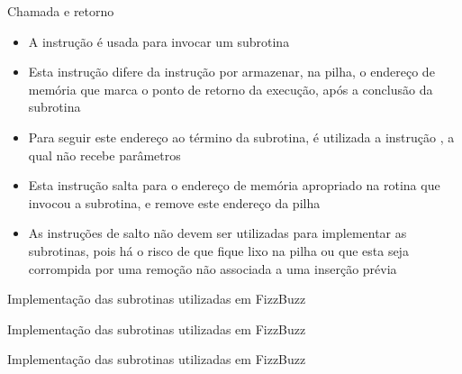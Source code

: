 \begin{frame}[fragile]{Chamada e retorno}

    \begin{itemize}
        \item A instrução  é usada para invocar um subrotina 


        \item Esta instrução difere da instrução  por armazenar, na pilha,
            o endereço de memória que marca o ponto de retorno da execução, após a conclusão
            da subrotina

        \item Para seguir este endereço ao término da subrotina, é utilizada a instrução
            , a qual não recebe parâmetros

        \item Esta instrução salta para o endereço de memória apropriado na rotina que invocou
            a subrotina, e remove este endereço da pilha

        \item As instruções de salto não devem ser utilizadas para implementar as subrotinas,
            pois há o risco de que fique lixo na pilha ou que esta seja corrompida por uma
            remoção não associada a uma inserção prévia
    \end{itemize}

\end{frame}

\begin{frame}[fragile]{Implementação das subrotinas utilizadas em FizzBuzz}
\end{frame}

\begin{frame}[fragile]{Implementação das subrotinas utilizadas em FizzBuzz}
\end{frame}

\begin{frame}[fragile]{Implementação das subrotinas utilizadas em FizzBuzz}
\end{frame}
